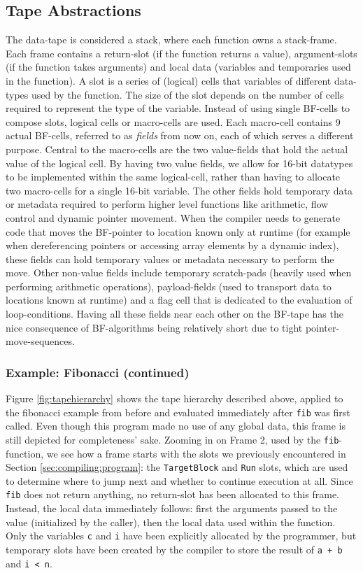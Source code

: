 \subsection{Tape Abstractions}
The data-tape is considered a stack, where each function owns a stack-frame. Each frame contains a return-slot (if the function returns a value), argument-slots (if the function takes arguments) and local data (variables and temporaries used in the function). A slot is a series of (logical) cells that variables of different data-types used by the function. The size of the slot depends on the number of cells required to represent the type of the variable. Instead of using single BF-cells to compose slots, logical cells or macro-cells are used. Each macro-cell contains 9 actual BF-cells, referred to as \emph{fields} from now on, each of which serves a different purpose. Central to the macro-cells are the two value-fields that hold the actual value of the logical cell. By having two value fields, we allow for 16-bit datatypes to be implemented within the same logical-cell, rather than having to allocate two macro-cells for a single 16-bit variable. The other fields hold temporary data or metadata required to perform higher level functions like arithmetic, flow control and dynamic pointer movement. When the compiler needs to generate code that moves the BF-pointer to location known only at runtime (for example when dereferencing pointers or accessing array elements by a dynamic index), these fields can hold temporary values or metadata necessary to perform the move. Other non-value fields include temporary scratch-pads (heavily used when performing arithmetic operations), payload-fields (used to transport data to locations known at runtime) and a flag cell that is dedicated to the evaluation of loop-conditions. Having all these fields near each other on the BF-tape has the nice consequence of BF-algorithms being relatively short due to tight pointer-move-sequences.

\subsubsection*{Example: Fibonacci (continued)}
Figure \ref{fig:tapehierarchy} shows the tape hierarchy described above, applied to the fibonacci example from before and evaluated immediately after \texttt{fib} was first called. Even though this program made no use of any global data, this frame is still depicted for completeness' sake. Zooming in on Frame 2, used by the \texttt{fib}-function, we see how a frame starts with the slots we previously encountered in Section \ref{sec:compiling:program}: the \texttt{TargetBlock} and \texttt{Run} slots, which are used to determine where to jump next and whether to continue execution at all. Since \texttt{fib} does not return anything, no return-slot has been allocated to this frame. Instead, the local data immediately follows: first the arguments passed to the value (initialized by the caller), then the local data used within the function. Only the variables \texttt{c} and \texttt{i} have been explicitly allocated by the programmer, but temporary slots have been created by the compiler to store the result of \texttt{a + b} and \texttt{i < n}.

